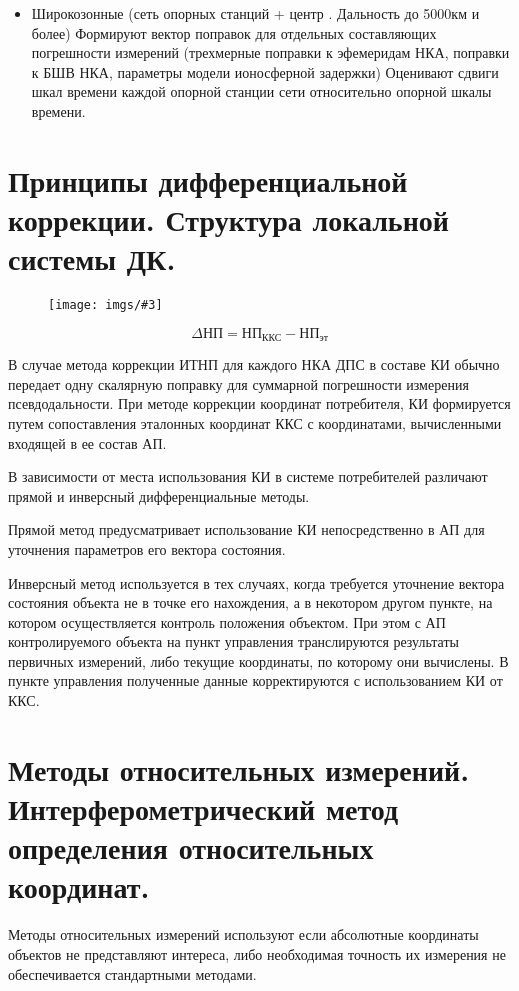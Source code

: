 \documentclass[14pt,a4paper,oneside]{extarticle}
\newcommand{\pic}[3]{
	\begin{figure}[#1]
		\begin{center}
			\texttt{[image: imgs/\#3]}
		\end{center}
	\end{figure}
}
\begin{document}
\begin{enumerate}
\begin{itemize}
              \item Широкозонные (сеть опорных станций + центр . Дальность до 5000км и более) Формируют вектор поправок для отдельных составляющих погрешности измерений (трехмерные поправки к эфемеридам НКА, поправки к БШВ НКА, параметры модели ионосферной задержки) Оценивают сдвиги шкал времени каждой опорной станции сети относительно опорной шкалы времени.
          \end{itemize}
\end{enumerate}

\section{Принципы дифференциальной коррекции. Структура локальной системы ДК.}

\pic{H}{\textwidth}{12}

\[\Delta \text{НП} = \text{НП}_\text{ККС} - \text{НП}_\text{эт} \]

В случае метода коррекции ИТНП для каждого НКА ДПС в составе КИ обычно передает одну скалярную поправку для суммарной погрешности измерения псевдодальности. При методе коррекции координат потребителя, КИ формируется путем сопоставления эталонных координат ККС с координатами, вычисленными входящей в ее состав АП.

В зависимости от места использования КИ в системе потребителей различают прямой и инверсный дифференциальные методы.

Прямой метод предусматривает использование КИ непосредственно в АП для уточнения параметров его вектора состояния.

Инверсный метод используется в тех случаях, когда требуется уточнение вектора состояния объекта не в точке его нахождения, а в некотором другом пункте, на котором осуществляется контроль положения объектом. При этом с АП контролируемого объекта на пункт управления транслируются результаты первичных измерений, либо текущие координаты, по которому они вычислены. В пункте управления полученные данные корректируются с использованием КИ от ККС.

\section{Методы относительных измерений. Интерферометрический метод определения относительных координат.}

Методы относительных измерений используют если абсолютные координаты объектов не представляют интереса, либо необходимая точность их измерения не обеспечивается стандартными методами.
\end{document}
